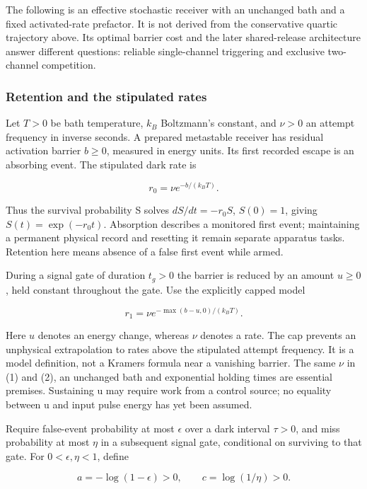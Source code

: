 \documentclass[11pt,a4paper]{article}
\begin{document}
The following is an effective stochastic receiver with an unchanged bath
and a fixed activated-rate prefactor. It is not derived from the
conservative quartic trajectory above. Its optimal barrier cost and the
later shared-release architecture answer different questions: reliable
single-channel triggering and exclusive two-channel competition.

\hypertarget{retention-and-the-stipulated-rates}{%
\subsubsection{Retention and the stipulated
rates}\label{retention-and-the-stipulated-rates}}

Let \(T>0\) be bath temperature, \(k_B\) Boltzmann's constant, and
\(\nu>0\) an attempt frequency in inverse seconds. A prepared metastable
receiver has residual activation barrier \(b\ge0\), measured in energy
units. Its first recorded escape is an absorbing event. The stipulated
dark rate is

\[r_0=\nu e^{-b/(k_BT)}. \tag{1}\]

Thus the survival probability S solves \(dS/dt=-r_0S\), \(S(0)=1\),
giving \(S(t)=\exp(-r_0t)\). Absorption describes a monitored first
event; maintaining a permanent physical record and resetting it remain
separate apparatus tasks. Retention here means absence of a false first
event while armed.

During a signal gate of duration \(t_g>0\) the barrier is reduced by an
amount \(u\ge0\), held constant throughout the gate. Use the explicitly
capped model

\[r_1=\nu e^{-\max(b-u,0)/(k_BT)}. \tag{2}\]

Here \(u\) denotes an energy change, whereas \(\nu\) denotes a rate. The
cap prevents an unphysical extrapolation to rates above the stipulated
attempt frequency. It is a model definition, not a Kramers formula near
a vanishing barrier. The same \(\nu\) in (1) and (2), an unchanged bath
and exponential holding times are essential premises. Sustaining u may
require work from a control source; no equality between u and input
pulse energy has yet been assumed.

Require false-event probability at most \(\epsilon\) over a dark
interval \(\tau>0\), and miss probability at most \(\eta\) in a
subsequent signal gate, conditional on surviving to that gate. For
\(0<\epsilon,\eta<1\), define

\[a=-\log(1-\epsilon)>0,\qquad c=\log(1/\eta)>0. \tag{3}\]
\end{document}
